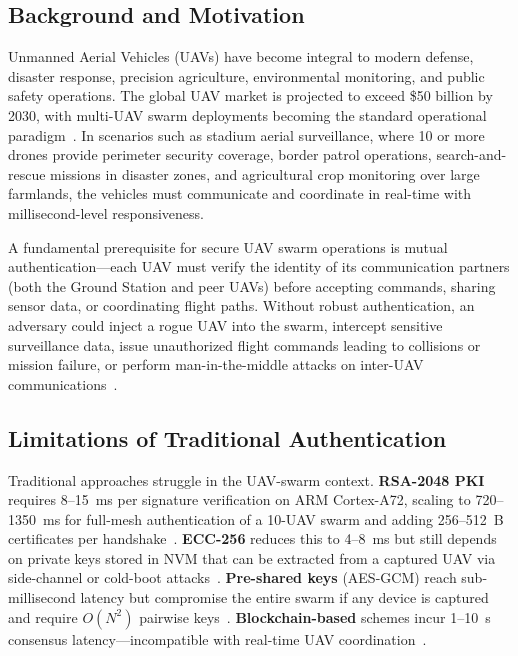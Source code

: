 \documentclass[11pt,a4paper]{article}
\begin{document}
\subsection{Background and Motivation}

Unmanned Aerial Vehicles (UAVs) have become integral to modern defense, disaster response, precision agriculture, environmental monitoring, and public safety operations. The global UAV market is projected to exceed \$50 billion by 2030, with multi-UAV swarm deployments becoming the standard operational paradigm~\cite{securing_uav_fanet}. In scenarios such as stadium aerial surveillance, where 10 or more drones provide perimeter security coverage, border patrol operations, search-and-rescue missions in disaster zones, and agricultural crop monitoring over large farmlands, the vehicles must communicate and coordinate in real-time with millisecond-level responsiveness.

A fundamental prerequisite for secure UAV swarm operations is mutual authentication---each UAV must verify the identity of its communication partners (both the Ground Station and peer UAVs) before accepting commands, sharing sensor data, or coordinating flight paths. Without robust authentication, an adversary could inject a rogue UAV into the swarm, intercept sensitive surveillance data, issue unauthorized flight commands leading to collisions or mission failure, or perform man-in-the-middle attacks on inter-UAV communications~\cite{puf_uav_cross_domain}.

\subsection{Limitations of Traditional Authentication}

Traditional approaches struggle in the UAV-swarm context. \textbf{RSA-2048 PKI} requires 8--15~ms per signature verification on ARM Cortex-A72, scaling to 720--1350~ms for full-mesh authentication of a 10-UAV swarm and adding 256--512~B certificates per handshake~\cite{puf_lightweight_uav}. \textbf{ECC-256} reduces this to 4--8~ms but still depends on private keys stored in NVM that can be extracted from a captured UAV via side-channel or cold-boot attacks~\cite{peer2peer_auth}. \textbf{Pre-shared keys} (AES-GCM) reach sub-millisecond latency but compromise the entire swarm if any device is captured and require $O(N^2)$ pairwise keys~\cite{puf_iot_strong_adversary}. \textbf{Blockchain-based} schemes incur 1--10~s consensus latency---incompatible with real-time UAV coordination~\cite{puf_ntu}.
\end{document}
